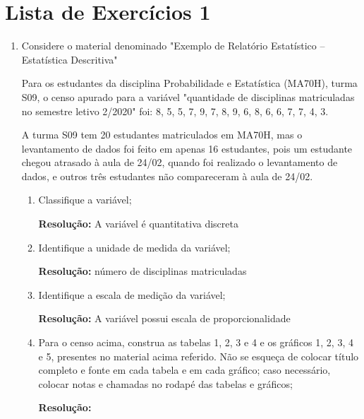 \chapter{Lista de Exercícios 1}


\begin{enumerate}[label=\emph{\arabic*})]

	\item Considere o material denominado "Exemplo de Relatório Estatístico – Estatística Descritiva"

	  	  Para os estudantes da disciplina Probabilidade e Estatística (MA70H), turma S09, o censo apurado para a variável "quantidade de disciplinas matriculadas no semestre letivo 2/2020" foi: 8, 5, 5, 7, 9, 7, 8, 9, 6, 8, 6, 6, 7, 7, 4, 3.

	      A turma S09 tem 20 estudantes matriculados em MA70H, mas o levantamento de dados foi feito em apenas 16 estudantes, pois um estudante chegou atrasado à aula de 24/02, quando foi realizado o levantamento de dados, e outros três estudantes não compareceram à aula de 24/02.

	      \begin{enumerate}[label=\emph{\alph*})]

		      \item Classifique a variável;
		      
				\textbf{Resolução:}	A variável é quantitativa discreta

		      \item Identifique a unidade de medida da variável;
		      
				\textbf{Resolução:}	número de disciplinas matriculadas
				
  			  \item Identifique a escala de medição da variável;
  			  
				\textbf{Resolução:}	A variável possui escala de proporcionalidade  
			  
			  \item \label{item_graficos} Para o censo acima, construa as tabelas 1, 2, 3 e 4 e os gráficos 1, 2, 3, 4 e 5, presentes no material acima referido. Não se esqueça de colocar título completo e fonte em cada tabela e em cada gráfico; caso necessário, colocar notas e chamadas no rodapé das tabelas e gráficos;
			  
				\textbf{Resolução:}
			  

\end{enumerate}
\end{enumerate}
